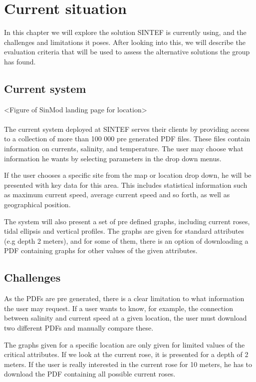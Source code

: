 \documentclass[11pt,a4paper,titlepage,oneside]{report}
\begin{document}
\chapter{Current situation}
In this chapter we will explore the solution SINTEF is currently using, and the challenges and limitations it poses. After looking into this, we will describe the evaluation criteria that will be used to assess the alternative solutions the group has found. 
\section{Current system}
<Figure of SinMod landing page for location>
\\
\\
The current system deployed at SINTEF serves their clients by providing access to a collection of more than 100 000 pre generated PDF files. These files contain information on currents, salinity, and temperature. The user may choose what information he wants by selecting parameters in the drop down menus. 

If the user chooses a specific site from the map or location drop down, he will be presented with key data for this area. This includes statistical information such as maximum current speed, average current speed and so forth, as well as geographical position. 

The system will also present a set of pre defined graphs, including current roses, tidal ellipsis and vertical profiles. The graphs are given for standard attributes (e.g depth 2 meters), and for some of them, there is an option of downloading a PDF containing graphs for other values of the given attributes. 

\section{Challenges}
As the PDFs are pre generated, there is a clear limitation to what information the user may request. If a user wants to know, for example, the connection between salinity and current speed at a given location, the user must download two different PDFs and manually compare these. 

The graphs given for a specific location are only given for limited values of the critical attributes. If we look at the current rose, it is presented for a depth of 2 meters. If the user is really interested in the current rose for 10 meters, he has to download the PDF containing all possible current roses. 
\end{document}
